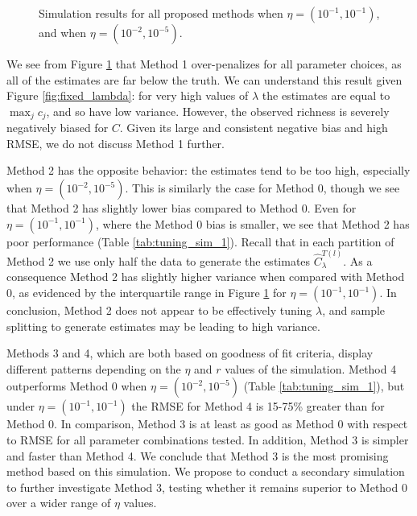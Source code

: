\documentclass[12pt]{article}
\begin{document}
\begin{figure}[t]
\caption{Simulation results for all proposed methods when $\eta = (10^{-1}, 10^{-1})$, and when $\eta = (10^{-2}, 10^{-5})$.
\label{fig:tuning_sim_1}}
\centering{}
\end{figure}

We see from Figure \ref{fig:tuning_sim_1} that Method 1 over-penalizes for all parameter choices, as all of the estimates are far below the truth. We can understand this result given Figure \ref{fig:fixed_lambda}: for very high values of $\lambda$ the estimates are equal to $\max_j c_j$, and so have low variance. However, the observed richness is severely negatively biased for $C$. Given its large and consistent negative bias and high RMSE, we do not discuss  Method 1 further.

Method 2 has the opposite behavior: the estimates tend to be too high, especially when $\eta = (10^{-2}, 10^{-5})$. This is similarly the case for Method 0, though we see that Method 2 has slightly lower bias compared to Method 0.
Even for $\eta = (10^{-1}, 10^{-1})$, where the Method 0 bias is smaller, we see that Method 2 has poor performance (Table \ref{tab:tuning_sim_1}).  Recall that in each partition of Method 2 we use only half the data to generate the estimates $\widehat{C}^{T(l)}_{\lambda}$.  As a consequence Method 2 has slightly higher variance when compared with Method 0, as evidenced by the interquartile range in Figure \ref{fig:tuning_sim_1} for $\eta = (10^{-1}, 10^{-1})$.  In conclusion, Method 2 does not appear to be effectively
tuning $\lambda$, and sample splitting to generate estimates may be leading to high variance.

Methods 3 and 4, which are both based on goodness of fit criteria, display different patterns depending on the $\eta$ and $r$ values of the simulation.
Method 4 outperforms Method 0 when $\eta = (10^{-2}, 10^{-5})$ (Table \ref{tab:tuning_sim_1}), but under $\eta = (10^{-1}, 10^{-1})$ the RMSE for Method 4 is 15-75\% greater than for Method 0. In comparison, Method 3 is at least as good as Method 0 with respect to RMSE for all parameter combinations tested. In addition,  Method 3 is simpler and faster than Method 4.  We conclude that Method 3 is the most promising method based on this simulation.  We propose to conduct a secondary simulation to further investigate Method 3, testing whether it remains superior to Method 0 over a wider range of $\eta$ values.
\end{document}
